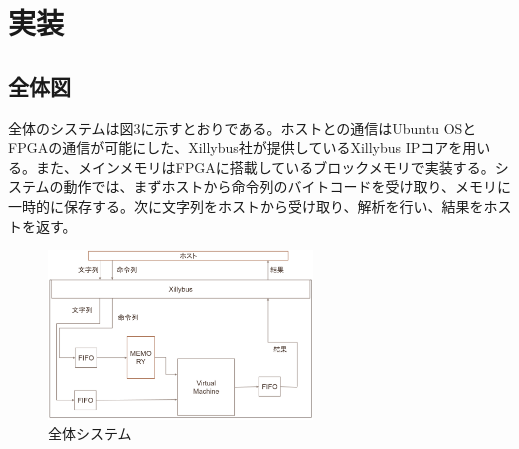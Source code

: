 \documentclass[submit]{ipsj}
\begin{document}


\section{実装}

\subsection{全体図}

全体のシステムは図3に示すとおりである。ホストとの通信はUbuntu OSとFPGAの通信が可能にした、Xillybus社が提供しているXillybus IPコアを用いる。また、メインメモリはFPGAに搭載しているブロックメモリで実装する。システムの動作では、まずホストから命令列のバイトコードを受け取り、メモリに一時的に保存する。次に文字列をホストから受け取り、解析を行い、結果をホストを返す。

\begin{figure}[h]
    \begin{center}
        \includegraphics[width=70mm]{./fig/system}
      \caption{全体システム}
    \end{center}
\end{figure}
\end{document}
